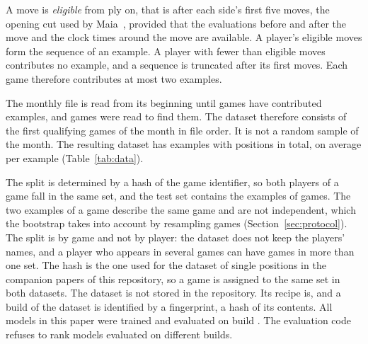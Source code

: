 \documentclass[11pt]{article}
\begin{document}
A move is \emph{eligible} from ply  on, that is after each
side's first five moves, the opening cut used by Maia~\cite{maia}, provided
that the evaluations before and after the move and the clock times around
the move are available. A player's eligible moves form the sequence of an
example. A player with fewer than  eligible moves
contributes no example, and a sequence is truncated after its first
 moves. Each game therefore contributes at most two
examples.

The monthly file is read from its beginning until  games have
contributed examples, and  games were read to find
them. The dataset therefore consists of the first qualifying games of the
month in file order. It is not a random sample of the month. The resulting
dataset has  examples with  positions in
total, on average  per example
(Table~\ref{tab:data}).

The split is determined by a hash of the game identifier, so both players of
a game fall in the same set, and the test set contains the examples of
 games. The two examples of a game describe the same game
and are not independent, which the bootstrap takes into account by resampling
games (Section~\ref{sec:protocol}). The split is by game and not by player:
the dataset does not keep the players' names, and a player who appears in
several games can have games in more than one set. The hash is the one used
for the dataset of single positions in the companion papers of this
repository, so a game is assigned to the same set in both datasets. The
dataset is not stored in the repository. Its recipe is, and a build of the
dataset is identified by a fingerprint, a hash of its contents. All models in
this paper were trained and evaluated on build . The
evaluation code refuses to rank models evaluated on different builds.

\begin{table}[htbp]\centering\small
{}
\caption{Dataset statistics by split. The mean target is the mean rating of
the players.}
\label{tab:data}
\end{table}

\iflook
\end{document}
